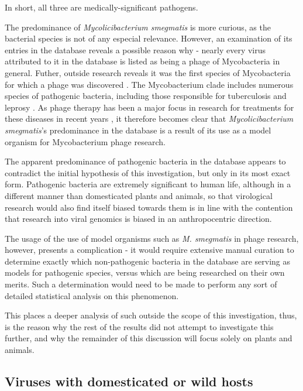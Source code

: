 \documentclass[12pt]{article}
\begin{document}
    In short, all three are medically-significant pathogens.

    The predominance of \emph{Mycolicibacterium smegmatis} is more curious, as the
    bacterial species is not of any especial relevance. However, an examination of 
    its entries in the database reveals a possible reason why - nearly every virus
    attributed to it in the database is listed as being a phage of Mycobacteria in
    general. Futher, outside research reveals it was the first species of
    Mycobacteria for which a phage was discovered \cite{first_myco}.
    The Mycobacterium clade includes numerous species of pathogenic
    bacteria, including those responsible for tuberculosis and leprosy \cite{myco}. As 
    phage therapy has been a major focus in research for treatments for these
    diseases in recent years \cite{myco_phage}, it therefore becomes clear that
    \emph{Mycolicibacterium smegmatis}'s predominance in the database is a result
    of its use as a model organism for Mycobacterium phage research.

    The apparent predominance of pathogenic bacteria in the database appears
    to contradict the initial hypothesis of this investigation, but only in its
    most exact form. Pathogenic bacteria are extremely significant to human life,
    although in a different manner than domesticated plants and animals,
    so that virological research would also find itself biased towards them is in
    line with the contention that research into viral genomics is biased in an
    anthropocentric direction.

    The usage of the use of model organisms such as \emph{M. smegmatis} in phage
    research, however, presents a complication - it would require extensive manual
    curation to determine exactly which non-pathogenic bacteria in the database
    are serving as models for pathogenic species, versus which are being researched
    on their own merits. Such a determination would need to be made to perform any
    sort of detailed statistical analysis on this phenomenon.

    This places a deeper analysis of such outside the scope of this investigation,
    thus, is the reason why the rest of the results did not attempt to investigate
    this further, and why the remainder of this discussion will focus solely on
    plants and animals.

    \subsection{Viruses with domesticated or wild hosts}
\end{document}
